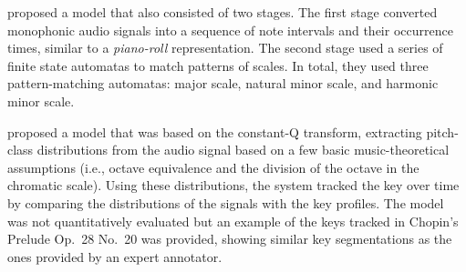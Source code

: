 \textcite{izmirli1994recognition} proposed a model that also
consisted of two stages. The first stage converted
monophonic audio signals into a sequence of note intervals
and their occurrence times, similar to a \emph{piano-roll}
representation. The second stage used a series of finite
state automatas to match patterns of scales. In total, they
used three pattern-matching automatas: major scale, natural
minor scale, and harmonic minor scale.


\textcite{purwins2000new} proposed a model that was based on
the constant-Q transform, extracting pitch-class
distributions from the audio signal based on a few basic
music-theoretical assumptions (i.e., octave equivalence and
the division of the octave in the chromatic scale). Using
these distributions, the system tracked the key over time by
comparing the distributions of the signals with the
\textcite{krumhansl1982tracing} key profiles. The model was
not quantitatively evaluated but an example of the keys
tracked in Chopin's Prelude Op.~28 No.~20 was provided,
showing similar key segmentations as the ones provided by an
expert annotator.



